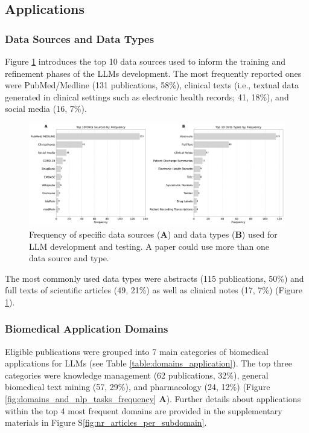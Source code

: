 \documentclass[fleqn,10pt]{olplainarticle}
\begin{document}
\subsection*{Applications}

\subsubsection*{Data Sources and Data Types}
Figure \ref{fig:top_10_data_sources_and_types} introduces the top 10 data sources used to inform the training and refinement phases of the LLMs development. The most frequently reported ones were PubMed/Medline (131 publications, 58\%), clinical texts (i.e., textual data generated in clinical settings such as electronic health records; 41, 18\%), and social media (16, 7\%).

\begin{figure}[!ht]
\begin{center}
\includegraphics[scale=0.3]{visuals/new_pdf/top_10_data_types_and_sources_frequency_2024.pdf} %
\caption{Frequency of specific data sources (\textbf{A}) and data types (\textbf{B}) used for LLM development and testing. A paper could use more than one data source and type.}
\label{fig:top_10_data_sources_and_types}
\end{center}
\end{figure}

The most commonly used data types were abstracts (115 publications, 50\%) and full texts of scientific articles (49, 21\%) as well as clinical notes (17, 7\%) (Figure \ref{fig:top_10_data_sources_and_types}).

\subsubsection*{Biomedical Application Domains}
Eligible publications were grouped into 7 main categories of biomedical applications for LLMs (see Table \ref{table:domains_application}). The top three categories were knowledge management (62 publications, 32\%), general biomedical text mining (57, 29\%), and pharmacology (24, 12\%) (Figure \ref{fig:domains_and_nlp_tasks_frequency} \textbf{A}). Further details about applications within the top 4 most frequent domains are provided in the supplementary materials in Figure S\ref{fig:nr_articles_per_subdomain}.
\end{document}
